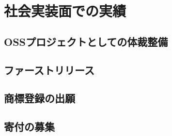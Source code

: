 \section{社会実装面での実績}

\subsection{OSSプロジェクトとしての体裁整備}

\subsection{ファーストリリース}

\subsection{商標登録の出願}

\subsection{寄付の募集}
